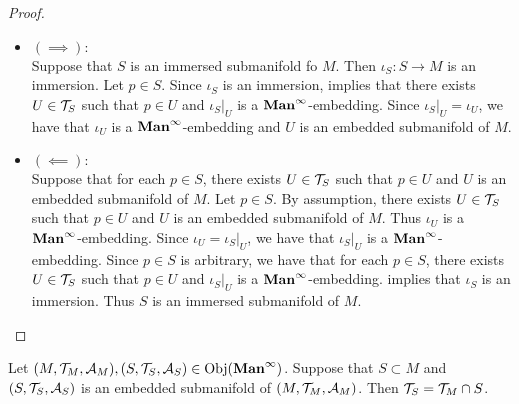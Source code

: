 \documentclass{book}
\begin{document}
	\begin{proof}\
		\begin{itemize}
			\item $(\implies):$ \\
			Suppose that $S$ is an immersed submanifold fo $M$. Then $\iota_S:S \rightarrow M$ is an immersion. Let $p \in S$. Since $\iota_S$ is an immersion,  implies that there exists $U \in \mathcal{T}_S$ such that $p \in U$ and $\iota_S|_U$ is a $\operatorname*{\text{\textbf{Man}}^{\infty}}$-embedding. Since $\iota_S|_U = \iota_U$, we have that $\iota_U$ is a $\operatorname*{\text{\textbf{Man}}^{\infty}}$-embedding and $U$ is an embedded submanifold of $M$.
			\item $(\impliedby):$ \\
			Suppose that for each $p \in S$, there exists $U \in \mathcal{T}_S$ such that $p \in U$ and $U$ is an embedded submanifold of $M$. Let $p \in S$. By assumption, there exists  $U \in \mathcal{T}_S$ such that $p \in U$ and $U$ is an embedded submanifold of $M$. Thus $\iota_U$ is a $\operatorname*{\text{\textbf{Man}}^{\infty}}$-embedding. Since $\iota_U = \iota_S|_U$, we have that $\iota_S|_U$ is a $\operatorname*{\text{\textbf{Man}}^{\infty}}$-embedding. Since $p \in S$ is arbitrary, we have that for each $p \in S$, there exists $U \in \mathcal{T}_S$ such that $p \in U$ and $\iota_S|_U$ is a $\operatorname*{\text{\textbf{Man}}^{\infty}}$-embedding.  implies that $\iota_S$ is an immersion. Thus $S$ is an immersed submanifold of $M$.
		\end{itemize}
	\end{proof}

	\begin{ex}   
		Let $(M, \mathcal{T}_M, \mathcal{A}_M), (S, \mathcal{T}_S, \mathcal{A}_S) \in \operatorname{Obj}(\operatorname*{\text{\textbf{Man}}^{\infty}})$. Suppose that $S \subset M$ and $(S, \mathcal{T}_S, \mathcal{A}_S)$ is an embedded submanifold of $(M, \mathcal{T}_M, \mathcal{A}_M)$. Then $\mathcal{T}_S = \mathcal{T}_M \cap S$. 
	\end{ex}
	
\end{document}
